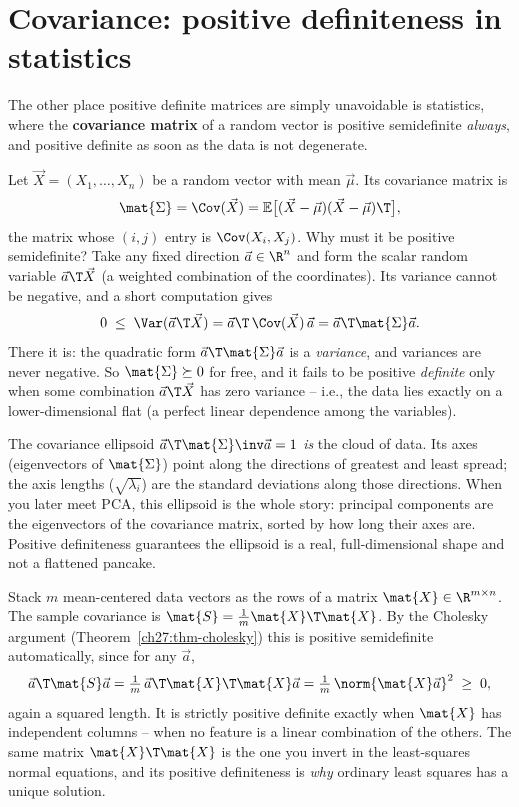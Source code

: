 \section{Covariance: positive definiteness in statistics}

The other place positive definite matrices are simply unavoidable is statistics, where the
\textbf{covariance matrix} of a random vector is positive semidefinite \emph{always}, and positive
definite as soon as the data is not degenerate.

Let $\vec{X} = (X_1,\dots,X_n)$ be a random vector with mean $\vec{\mu}$. Its covariance matrix is
\[
  \mat{\Sigma} = \Cov(\vec{X}) = \mathbb{E}\big[(\vec{X}-\vec{\mu})(\vec{X}-\vec{\mu})\T\big],
\]
the matrix whose $(i,j)$ entry is $\Cov(X_i,X_j)$. Why must it be positive semidefinite? Take any
fixed direction $\vec{a}\in\R^n$ and form the scalar random variable $\vec{a}\T\vec{X}$ (a weighted
combination of the coordinates). Its variance cannot be negative, and a short computation gives
\[
  0 \;\leq\; \Var(\vec{a}\T\vec{X})
  = \vec{a}\T \,\Cov(\vec{X})\, \vec{a}
  = \vec{a}\T\mat{\Sigma}\vec{a}.
\]
There it is: the quadratic form $\vec{a}\T\mat{\Sigma}\vec{a}$ is a \emph{variance}, and variances
are never negative. So $\mat{\Sigma}\succeq0$ for free, and it fails to be positive \emph{definite}
only when some combination $\vec{a}\T\vec{X}$ has zero variance -- i.e., the data lies exactly on a
lower-dimensional flat (a perfect linear dependence among the variables).

\begin{intuitionbox}
The covariance ellipsoid $\vec{a}\T\mat{\Sigma}\inv\vec{a} = 1$ \emph{is} the cloud of data. Its axes
(eigenvectors of $\mat{\Sigma}$) point along the directions of greatest and least spread; the axis
lengths ($\sqrt{\lambda_i}$) are the standard deviations along those directions. When you later meet
PCA, this ellipsoid is the whole story: principal components are the eigenvectors of the covariance
matrix, sorted by how long their axes are. Positive definiteness guarantees the ellipsoid is a real,
full-dimensional shape and not a flattened pancake.
\end{intuitionbox}

\begin{example}
\label{ch27:ex-cov}
Stack $m$ mean-centered data vectors as the rows of a matrix $\mat{X}\in\R^{m\times n}$. The sample
covariance is $\mat{S} = \tfrac1m\mat{X}\T\mat{X}$. By the Cholesky argument
(Theorem~\ref{ch27:thm-cholesky}) this is positive semidefinite automatically, since for any
$\vec{a}$,
\[
  \vec{a}\T\mat{S}\vec{a} = \tfrac1m\,\vec{a}\T\mat{X}\T\mat{X}\vec{a}
  = \tfrac1m\,\norm{\mat{X}\vec{a}}^2 \;\geq\; 0,
\]
again a squared length. It is strictly positive definite exactly when $\mat{X}$ has independent
columns -- when no feature is a linear combination of the others. The same matrix $\mat{X}\T\mat{X}$
is the one you invert in the least-squares normal equations, and its positive definiteness is
\emph{why} ordinary least squares has a unique solution.
\end{example}

